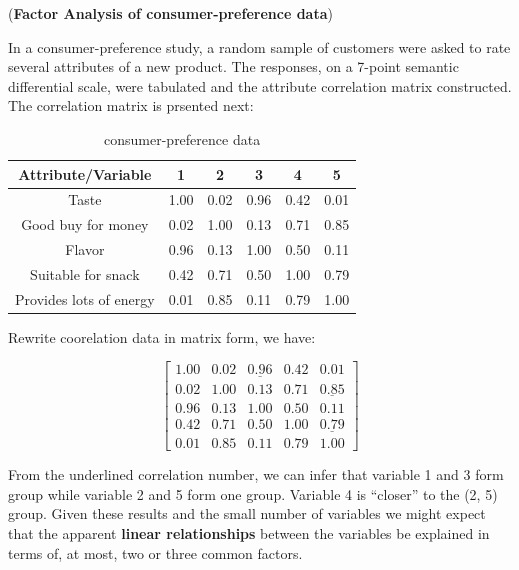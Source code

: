 \documentclass[a4paper]{book}
\newcommand{\head}[1]{\textbf{#1}}
\newenvironment{example}[1][Example]{\begin{trivlist}
\item[\hskip \labelsep {\bfseries #1}]}{\end{trivlist}}
\begin{document}
  \begin{example}
    (\textbf{Factor Analysis of consumer-preference data})

    In a consumer-preference study, a random sample of customers were asked to
    rate several attributes of a new product. The responses, on a 7-point
    semantic differential scale, were tabulated and the attribute correlation
    matrix constructed. The correlation matrix is prsented next:

    \begin{table}[h]
      \centering
      \begin{tabular}{cccccc}
        \toprule[1.5pt]
        \head{Attribute/Variable}   & \head{1}  & \head{2}  & \head{3}  & \head{4}  & \head{5} \\
        \midrule
        Taste                       & 1.00      & 0.02      & 0.96      &    0.42   & 0.01 \\
        Good buy for money          & 0.02      & 1.00      & 0.13      &    0.71   & 0.85 \\
        Flavor                      & 0.96      & 0.13      & 1.00      &    0.50   & 0.11 \\
        Suitable for snack          & 0.42      & 0.71      & 0.50      &    1.00   & 0.79 \\
        Provides lots of energy     & 0.01      & 0.85      & 0.11      &    0.79   & 1.00 \\
        \bottomrule[1.5pt]
      \end{tabular}
      \caption{consumer-preference data\label{tab:consumer_preference_data}}
    \end{table}

    Rewrite coorelation data in matrix form, we have:

    \begin{displaymath}
      \begin{bmatrix}
         1.00      & 0.02      & \underline{0.96}      &    0.42   & 0.01 \\
         0.02      & 1.00      & 0.13      &    0.71   & \underline{0.85} \\
         0.96      & 0.13      & 1.00      &    0.50   & 0.11 \\
         0.42      & 0.71      & 0.50      &    1.00   & \underline{0.79} \\
         0.01      & 0.85      & 0.11      &    0.79   & 1.00
      \end{bmatrix}
    \end{displaymath}

    From the underlined correlation number, we can infer that variable 1 and 3
    form group while variable 2 and 5 form one group. Variable 4 is ``closer''
    to the (2, 5) group. Given these results and the small number of variables
    we might expect that the apparent \textbf{linear relationships} between the
    variables be explained in terms of, at most, two or three common factors.
  \end{example}
\end{document}
